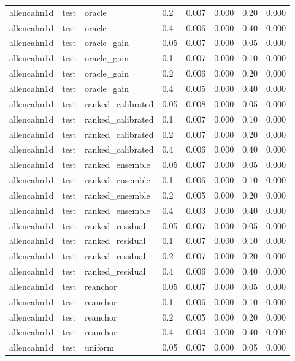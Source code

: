 \begin{tabular}{llllrrrr}
allencahn1d & test & oracle & 0.2 & 0.007 & 0.000 & 0.20 & 0.000 \\
allencahn1d & test & oracle & 0.4 & 0.006 & 0.000 & 0.40 & 0.000 \\
allencahn1d & test & oracle\_gain & 0.05 & 0.007 & 0.000 & 0.05 & 0.000 \\
allencahn1d & test & oracle\_gain & 0.1 & 0.007 & 0.000 & 0.10 & 0.000 \\
allencahn1d & test & oracle\_gain & 0.2 & 0.006 & 0.000 & 0.20 & 0.000 \\
allencahn1d & test & oracle\_gain & 0.4 & 0.005 & 0.000 & 0.40 & 0.000 \\
allencahn1d & test & ranked\_calibrated & 0.05 & 0.008 & 0.000 & 0.05 & 0.000 \\
allencahn1d & test & ranked\_calibrated & 0.1 & 0.007 & 0.000 & 0.10 & 0.000 \\
allencahn1d & test & ranked\_calibrated & 0.2 & 0.007 & 0.000 & 0.20 & 0.000 \\
allencahn1d & test & ranked\_calibrated & 0.4 & 0.006 & 0.000 & 0.40 & 0.000 \\
allencahn1d & test & ranked\_ensemble & 0.05 & 0.007 & 0.000 & 0.05 & 0.000 \\
allencahn1d & test & ranked\_ensemble & 0.1 & 0.006 & 0.000 & 0.10 & 0.000 \\
allencahn1d & test & ranked\_ensemble & 0.2 & 0.005 & 0.000 & 0.20 & 0.000 \\
allencahn1d & test & ranked\_ensemble & 0.4 & 0.003 & 0.000 & 0.40 & 0.000 \\
allencahn1d & test & ranked\_residual & 0.05 & 0.007 & 0.000 & 0.05 & 0.000 \\
allencahn1d & test & ranked\_residual & 0.1 & 0.007 & 0.000 & 0.10 & 0.000 \\
allencahn1d & test & ranked\_residual & 0.2 & 0.007 & 0.000 & 0.20 & 0.000 \\
allencahn1d & test & ranked\_residual & 0.4 & 0.006 & 0.000 & 0.40 & 0.000 \\
allencahn1d & test & reanchor & 0.05 & 0.007 & 0.000 & 0.05 & 0.000 \\
allencahn1d & test & reanchor & 0.1 & 0.006 & 0.000 & 0.10 & 0.000 \\
allencahn1d & test & reanchor & 0.2 & 0.005 & 0.000 & 0.20 & 0.000 \\
allencahn1d & test & reanchor & 0.4 & 0.004 & 0.000 & 0.40 & 0.000 \\
allencahn1d & test & uniform & 0.05 & 0.007 & 0.000 & 0.05 & 0.000 \\

\end{tabular}
